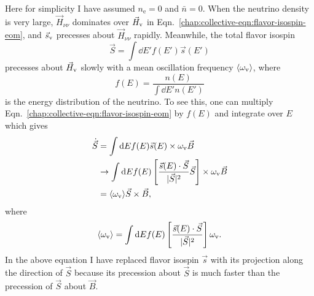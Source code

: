 Here for simplicity I have assumed $n_{\mathrm e}=0$ and $\bar n=0$. When the neutrino density is very large, $\vec H_{\nu\nu}$ dominates over $\vec H_\mathrm v$ in Eqn.~\eqref{chap:collective-eqn:flavor-isospin-eom}, and $\vec s_\mathrm v$ precesses about $\vec H_{\nu\nu}$ rapidly. Meanwhile, the total flavor isospin
\begin{equation}
    \vec S = \int \dd E' f(E') \vec s(E')
\end{equation}
precesses about $\vec H_\mathrm v$ slowly with a mean oscillation frequency $\langle \omega_\mathrm v \rangle$, where
\begin{equation}
    f(E) = \frac{ n(E) }{ \int \dd E' n(E') }
\end{equation}
is the energy distribution of the neutrino. To see this, one can multiply Eqn.~\eqref{chap:collective-eqn:flavor-isospin-eom} by $f(E)$ and integrate over $E$ which gives
\begin{align}
    \dot{\vec S} &= \int \mathrm d E f(E)\vec s(E) \times \omega_\mathrm v \vec B \\
    &\to \int \mathrm d E f(E) \left[ \frac{\vec s(E) \cdot \vec S}{ \lvert \vec S \rvert^2 } \vec S \right] \times \omega_\mathrm v \vec B \\
    &= \langle \omega_\mathrm v \rangle \vec S \times \vec B,
\end{align}
where
\begin{equation}
    \langle \omega_\mathrm v \rangle  = \int \mathrm d E f(E) \left[ \frac{\vec s(E) \cdot \vec S}{ \lvert \vec S \rvert^2 } \right] \omega_\mathrm v.
\end{equation}
In the above equation I have replaced flavor isospin $\vec s$ with its projection along the direction of $\vec S$ because its precession about $\vec S$ is much faster than the precession of $\vec S$ about $\vec B$.


